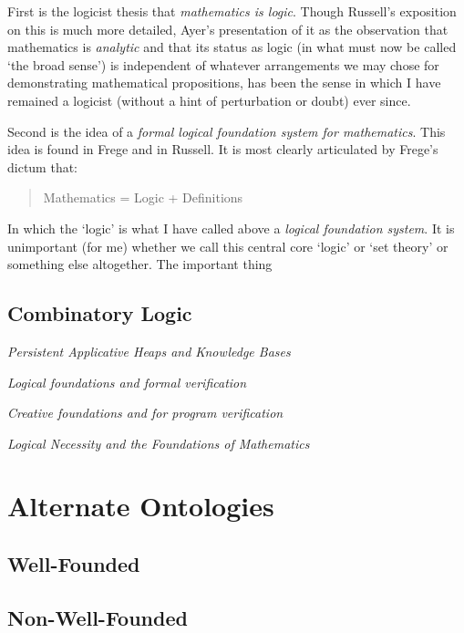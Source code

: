 \documentclass[10pt,titlepage]{book}
\begin{document}
First is the logicist thesis that \emph{mathematics is logic}.
Though Russell's exposition on this is much more detailed, Ayer's presentation of it as the observation that mathematics is \emph{analytic} and that its status as logic (in what must now be called `the broad sense') is independent of whatever arrangements we may chose for demonstrating mathematical propositions, has been the sense in which I have remained a logicist (without a hint of perturbation or doubt) ever since.

Second is the idea of a \emph{formal logical foundation system for mathematics}.
This idea is found in Frege and in Russell.
It is most clearly articulated by Frege's dictum that:

\begin{centering}
\begin{quote}
Mathematics = Logic + Definitions
\end{quote}
\end{centering}

In which the `logic' is what I have called above a \emph{logical foundation system}.
It is unimportant (for me) whether we call this central core `logic' or `set theory' or something else altogether.
The important thing 

\subsection{Combinatory Logic}

\emph{Persistent Applicative Heaps and Knowledge Bases}\cite{jones85}

\emph{Logical foundations and formal verification}\cite{jones86a}

\emph{Creative foundations and for program verification}\cite{jones86b}

\emph{Logical Necessity and the Foundations of Mathematics}\cite{jones87}

\section{Alternate Ontologies}

\subsection{Well-Founded}

\subsection{Non-Well-Founded}
\end{document}
